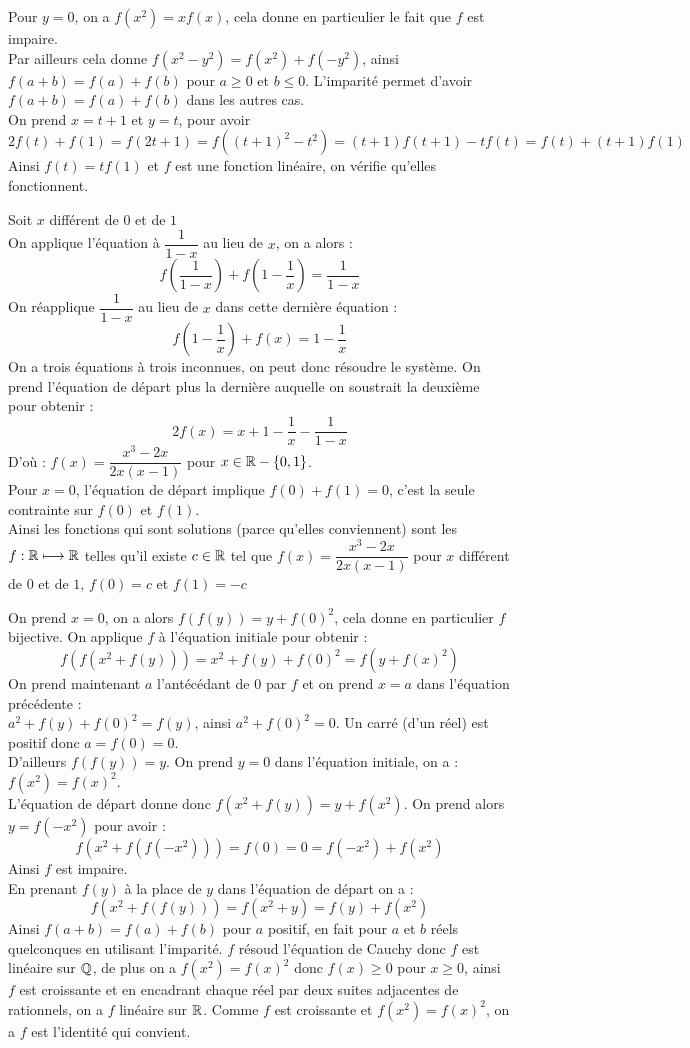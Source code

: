 \begin{sol}[][10]
Pour $y=0$, on a $f(x^2)=xf(x)$, cela donne en particulier le fait que $f$ est impaire.\\
Par ailleurs cela donne $f(x^2-y^2)=f(x^2)+f(-y^2)$, ainsi $f(a+b)=f(a)+f(b)$ pour $a\ge0$ et $b\le0$. L'imparité permet d'avoir $f(a+b)=f(a)+f(b)$ dans les autres cas.\\
On prend $x=t+1$ et $y=t$, pour avoir $$2f(t)+f(1)=f(2t+1)=f((t+1)^2-t^2)=(t+1)f(t+1)-tf(t)=f(t)+(t+1)f(1)$$ Ainsi $f(t)=tf(1)$ et $f$ est une fonction linéaire, on vérifie qu'elles fonctionnent.
\end{sol}
\begin{sol}[][11]
Soit $x$ différent de $0$ et de $1$ \\
On applique l'équation à $\dfrac1{1-x}$ au lieu de $x$, on a alors : $$f\left(\dfrac1{1-x}\right)+f\left(1-\dfrac1x\right)=\dfrac1{1-x}$$
On réapplique $\dfrac1{1-x}$ au lieu de $x$ dans cette dernière équation : $$f\left(1-\dfrac1x\right)+f(x)=1-\dfrac1x$$
On a trois équations à trois inconnues, on peut donc résoudre le système. On prend l'équation de départ plus la dernière auquelle on soustrait la deuxième pour obtenir : $$2f(x)=x+1-\dfrac1x-\dfrac1{1-x}$$
D'où : $f(x)=\dfrac{x^3-2x}{2x(x-1)}$ pour $x\in\mathbb R-\{0,1\}$.\\
Pour $x=0$, l'équation de départ implique $f(0)+f(1)=0$, c'est la seule contrainte sur $f(0)$ et $f(1)$. \\
Ainsi les fonctions qui sont solutions (parce qu'elles conviennent) sont les $f:\mathbb R\longmapsto\mathbb R$ telles qu'il existe $c\in\mathbb R$ tel que $f(x)=\dfrac{x^3-2x}{2x(x-1)}$ pour $x$ différent de $0$ et de $1$, $f(0)=c$ et $f(1)=-c$
\end{sol}

\begin{sol}[][12]
On prend $x=0$, on a alors $f(f(y))=y+f(0)^2$, cela donne en particulier $f$ bijective.
On applique $f$ à l'équation initiale pour obtenir :
$$f(f(x^2+f(y)))=x^2+f(y)+f(0)^2=f(y+f(x)^2)$$
On prend maintenant $a$ l'antécédant de $0$ par $f$ et on prend $x=a$ dans l'équation précédente :\\
$a^2+f(y)+f(0)^2=f(y)$, ainsi $a^2+f(0)^2=0$. Un carré (d'un réel) est positif donc $a=f(0)=0$.\\
D'ailleurs $f(f(y))=y$.
On prend $y=0$ dans l'équation initiale, on a : $f(x^2)=f(x)^2$.\\
L'équation de départ donne donc $f(x^2+f(y))=y+f(x^2)$. On prend alors $y=f(-x^2)$ pour avoir :
$$f(x^2+f(f(-x^2)))=f(0)=0=f(-x^2)+f(x^2)$$
Ainsi $f$ est impaire.\\
En prenant $f(y)$ à la place de $y$ dans l'équation de départ on a :
$$f(x^2+f(f(y)))=f(x^2+y)=f(y)+f(x^2)$$
Ainsi $f(a+b)=f(a)+f(b)$ pour $a$ positif, en fait pour $a$ et $b$ réels quelconques en utilisant l'imparité. $f$ résoud l'équation de Cauchy donc $f$ est linéaire sur $\mathbb Q$, de plus on a $f(x^2)=f(x)^2$ donc $f(x)\ge0$ pour $x\ge0$, ainsi $f$ est croissante et en encadrant chaque réel par deux suites adjacentes de rationnels, on a $f $ linéaire sur $\mathbb R$. Comme $f$ est croissante et $f(x^2)=f(x)^2$, on a $f$ est l'identité qui convient.
\end{sol}